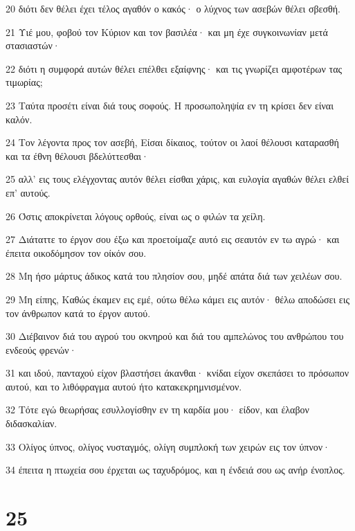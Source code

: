 \par 20 διότι δεν θέλει έχει τέλος αγαθόν ο κακός· ο λύχνος των ασεβών θέλει σβεσθή.
\par 21 Υιέ μου, φοβού τον Κύριον και τον βασιλέα· και μη έχε συγκοινωνίαν μετά στασιαστών·
\par 22 διότι η συμφορά αυτών θέλει επέλθει εξαίφνης· και τις γνωρίζει αμφοτέρων τας τιμωρίας;
\par 23 Ταύτα προσέτι είναι διά τους σοφούς. Η προσωποληψία εν τη κρίσει δεν είναι καλόν.
\par 24 Τον λέγοντα προς τον ασεβή, Είσαι δίκαιος, τούτον οι λαοί θέλουσι καταρασθή και τα έθνη θέλουσι βδελύττεσθαι·
\par 25 αλλ' εις τους ελέγχοντας αυτόν θέλει είσθαι χάρις, και ευλογία αγαθών θέλει ελθεί επ' αυτούς.
\par 26 Όστις αποκρίνεται λόγους ορθούς, είναι ως ο φιλών τα χείλη.
\par 27 Διάταττε το έργον σου έξω και προετοίμαζε αυτό εις σεαυτόν εν τω αγρώ· και έπειτα οικοδόμησον τον οίκόν σου.
\par 28 Μη ήσο μάρτυς άδικος κατά του πλησίον σου, μηδέ απάτα διά των χειλέων σου.
\par 29 Μη είπης, Καθώς έκαμεν εις εμέ, ούτω θέλω κάμει εις αυτόν· θέλω αποδώσει εις τον άνθρωπον κατά το έργον αυτού.
\par 30 Διέβαινον διά του αγρού του οκνηρού και διά του αμπελώνος του ανθρώπου του ενδεούς φρενών·
\par 31 και ιδού, πανταχού είχον βλαστήσει άκανθαι· κνίδαι είχον σκεπάσει το πρόσωπον αυτού, και το λιθόφραγμα αυτού ήτο κατακεκρημνισμένον.
\par 32 Τότε εγώ θεωρήσας εσυλλογίσθην εν τη καρδία μου· είδον, και έλαβον διδασκαλίαν.
\par 33 Ολίγος ύπνος, ολίγος νυσταγμός, ολίγη συμπλοκή των χειρών εις τον ύπνον·
\par 34 έπειτα η πτωχεία σου έρχεται ως ταχυδρόμος, και η ένδειά σου ως ανήρ ένοπλος.

\chapter{25}

